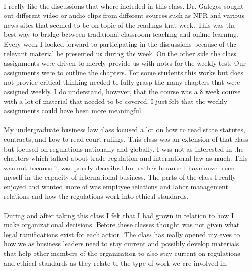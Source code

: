 \documentclass[12pt,titlepage]{article}
\begin{document}
\paragraph {}
I really like the discussions that where included in this class. Dr. Galegos sought out different video or audio clips from different sources such as NPR and various news sites that seemed to be on topic of the readings that week. This was the best way to bridge between traditional classroom teaching and online learning. Every week I looked forward to participating in the discussions because of the relevant material he presented us during the week. On the other side the class assignments were driven to merely provide us with notes for the weekly test. Our assignments were to outline the chapters. For some students this works but does not provide critical thinking needed to fully grasp the many chapters that were assigned weekly. I do understand, however, that the course was a 8 week course with a lot of material that needed to be covered. I just felt that the weekly assignments could have been more meaningful.
\paragraph {}
My undergraduate business law class focused a lot on how to read state statutes, contracts, and how to read court rulings. This class was an extension of that class but focused on regulations nationally and globally. I was not as interested in the chapters which talked about trade regulation and international law as much. This was not because it was poorly described but rather because I have never seen myself in the capacity of international business. The parts of the class I really enjoyed and wanted more of was employee relations and labor management relations and how the regulations work into ethical standards.
\paragraph {}
During and after taking this class I felt that I had grown in relation to how I make organizational decisions. Before these classes thought was not given what legal ramifications exist for each action. The class has really opened my eyes to how we as business leaders need to stay current and possibly develop materials that help other members of the organization to also stay current on regulations and ethical standards as they relate to the type of work we are involved in.
\end{document}
